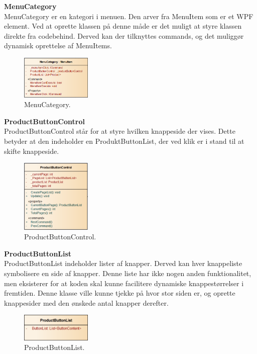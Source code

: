 \textbf{MenuCategory}\\
MenuCategory er en kategori i menuen. Den arver fra MenuItem som er et WPF element. Ved at oprette klassen på denne måde er det muligt at styre klassen direkte fra codebehind. Derved kan der tilknyttes commands, og det muliggør dynamisk oprettelse af MenuItems.


\begin{figure}[H]
	\centering
	\includegraphics[width=0.3\textwidth]{Systemdesign/Frontend/pics/MenuCategory}
	\caption{MenuCategory.}
	\label{fig:PBC}
\end{figure}

\textbf{ProductButtonControl} \\
ProductButtonControl står for at styre hvilken knappeside der vises. Dette betyder at den indeholder en ProduktButtonList, der ved klik er i stand til at skifte knappeside.

\begin{figure}[H]
	\centering
	\includegraphics[width=0.3\textwidth]{Systemdesign/Frontend/pics/ProductButtonControl}
	\caption{ProductButtonControl.}
	\label{fig:PBC}
\end{figure}

\textbf{ProductButtonList} \\
ProductButtonList indeholder lister af knapper. Derved kan hver knappeliste symbolisere en side af knapper. Denne liste har ikke nogen anden funktionalitet, men eksisterer for at koden skal kunne facilitere dynamiske knappestørrelser i fremtiden. Denne klasse ville kunne tjekke på hvor stor siden er, og oprette knappesider med den ønskede antal knapper derefter.


\begin{figure}[H]
	\centering
	\includegraphics[width=0.3\textwidth]{Systemdesign/Frontend/pics/ProductButtonList}
	\caption{ProductButtonList.}
	\label{fig:PBL}
\end{figure}

